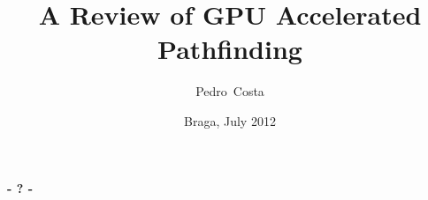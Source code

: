 \documentclass{beamer}
\title[GPU Accelerated Pathfinding]{A Review of GPU Accelerated Pathfinding}
\author[P.Costa]{Pedro~Costa}
\institute[19830]{
	Department of Informatics\\
	University of Minho
}
\date{Braga, July 2012}
\begin{document}

\frame[plain]{\titlepage}







\begin{frame}[plain]
	\titlepage
	\begin{center}
		\Huge\bfseries - ? -
	\end{center}
\end{frame}
\end{document}
